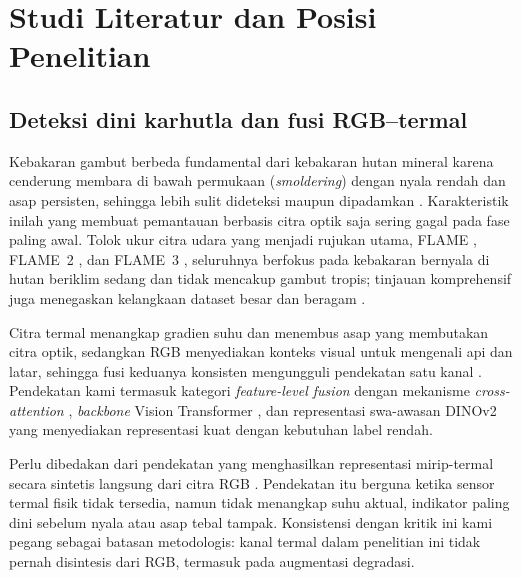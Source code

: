 
\section{Studi Literatur dan Posisi Penelitian}

\subsection{Deteksi dini karhutla dan fusi RGB--termal}

Kebakaran gambut berbeda fundamental dari kebakaran hutan mineral karena
cenderung membara di bawah permukaan (\emph{smoldering}) dengan nyala rendah dan
asap persisten, sehingga lebih sulit dideteksi maupun dipadamkan
\cite{ballhorn2016}. Karakteristik inilah yang membuat pemantauan berbasis citra
optik saja sering gagal pada fase paling awal. Tolok ukur citra udara yang
menjadi rujukan utama, FLAME \cite{flame2021}, FLAME~2 \cite{flame2_2022}, dan
FLAME~3 \cite{flame3_2025}, seluruhnya berfokus pada kebakaran bernyala di
hutan beriklim sedang dan tidak mencakup gambut tropis; tinjauan komprehensif
juga menegaskan kelangkaan dataset besar dan beragam \cite{review2025}.

Citra termal menangkap gradien suhu dan menembus asap yang membutakan citra
optik, sedangkan RGB menyediakan konteks visual untuk mengenali api dan latar,
sehingga fusi keduanya konsisten mengungguli pendekatan satu kanal
\cite{zhang2025}. Pendekatan kami termasuk kategori \emph{feature-level fusion}
dengan mekanisme \emph{cross-attention} \cite{vaswani2017}, \emph{backbone}
Vision Transformer \cite{dosovitskiy2021}, dan representasi swa-awasan DINOv2
\cite{oquab2024} yang menyediakan representasi kuat dengan kebutuhan label
rendah.

Perlu dibedakan dari pendekatan yang menghasilkan representasi mirip-termal
secara sintetis langsung dari citra RGB \cite{synthetic2026}. Pendekatan itu
berguna ketika sensor termal fisik tidak tersedia, namun tidak menangkap suhu
aktual, indikator paling dini sebelum nyala atau asap tebal tampak. Konsistensi
dengan kritik ini kami pegang sebagai batasan metodologis: kanal termal dalam
penelitian ini tidak pernah disintesis dari RGB, termasuk pada augmentasi
degradasi.

